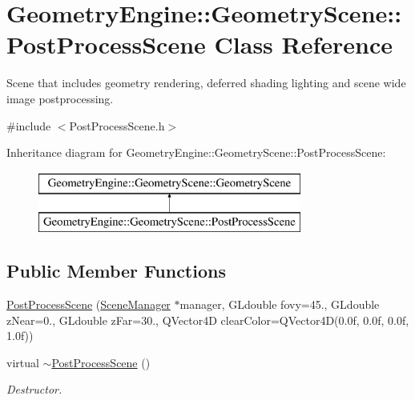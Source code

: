 \hypertarget{class_geometry_engine_1_1_geometry_scene_1_1_post_process_scene}{}\section{Geometry\+Engine\+::Geometry\+Scene\+::Post\+Process\+Scene Class Reference}
\label{class_geometry_engine_1_1_geometry_scene_1_1_post_process_scene}


Scene that includes geometry rendering, deferred shading lighting and scene wide image postprocessing.  




{\ttfamily \#include $<$Post\+Process\+Scene.\+h$>$}

Inheritance diagram for Geometry\+Engine\+::Geometry\+Scene\+::Post\+Process\+Scene\+:\begin{figure}[H]
\begin{center}
\leavevmode
\includegraphics[height=2.000000cm]{class_geometry_engine_1_1_geometry_scene_1_1_post_process_scene}
\end{center}
\end{figure}
\subsection*{Public Member Functions}
\begin{DoxyCompactItemize}
\item 
\mbox{\hyperlink{class_geometry_engine_1_1_geometry_scene_1_1_post_process_scene_a1b5d3ffbc35c2490077edd12ef53c5f8}{Post\+Process\+Scene}} (\mbox{\hyperlink{class_geometry_engine_1_1_scene_manager}{Scene\+Manager}} $\ast$manager, G\+Ldouble fovy=45., G\+Ldouble z\+Near=0., G\+Ldouble z\+Far=30., Q\+Vector4D clear\+Color=Q\+Vector4D(0.\+0f, 0.\+0f, 0.\+0f, 1.\+0f))
\item 
\mbox{\label{class_geometry_engine_1_1_geometry_scene_1_1_post_process_scene_af31a9ab2090f190c96113aa87224c6f4}} 
virtual \mbox{\hyperlink{class_geometry_engine_1_1_geometry_scene_1_1_post_process_scene_af31a9ab2090f190c96113aa87224c6f4}{$\sim$\+Post\+Process\+Scene}} ()
\begin{DoxyCompactList}\small\item\em Destructor. \end{DoxyCompactList}\end{DoxyCompactItemize}
